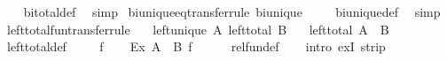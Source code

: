 \begin{isabellebody}
\ \ %
\endisadelimproof
%
\isatagproof
{}\isamarkupfalse%
\ bi{\isacharunderscore}{\kern0pt}total{\isacharunderscore}{\kern0pt}def\ \isamarkupfalse%
\ simp%
\endisatagproof
{\isafoldproof}%
%
\isadelimproof
\isanewline
%
\endisadelimproof
\isanewline
{}\isamarkupfalse%
\ bi{\isacharunderscore}{\kern0pt}unique{\isacharunderscore}{\kern0pt}eq{\isacharbrackleft}{\kern0pt}transfer{\isacharunderscore}{\kern0pt}rule{\isacharbrackright}{\kern0pt}{\isacharcolon}{\kern0pt}\ {\isachardoublequoteopen}bi{\isacharunderscore}{\kern0pt}unique\ {\isacharparenleft}{\kern0pt}{\isacharequal}{\kern0pt}{\isacharparenright}{\kern0pt}{\isachardoublequoteclose}\isanewline
%
\isadelimproof
\ \ %
\endisadelimproof
%
\isatagproof
{}\isamarkupfalse%
\ bi{\isacharunderscore}{\kern0pt}unique{\isacharunderscore}{\kern0pt}def\ \isamarkupfalse%
\ simp%
\endisatagproof
{\isafoldproof}%
%
\isadelimproof
\isanewline
%
\endisadelimproof
\isanewline
{}\isamarkupfalse%
\ left{\isacharunderscore}{\kern0pt}total{\isacharunderscore}{\kern0pt}fun{\isacharbrackleft}{\kern0pt}transfer{\isacharunderscore}{\kern0pt}rule{\isacharbrackright}{\kern0pt}{\isacharcolon}{\kern0pt}\isanewline
\ \ \ {\isachardoublequoteopen}left{\isacharunderscore}{\kern0pt}unique\ A{\isachardoublequoteclose}\ {\isachardoublequoteopen}left{\isacharunderscore}{\kern0pt}total\ B{\isachardoublequoteclose}\isanewline
\ \ \ {\isachardoublequoteopen}left{\isacharunderscore}{\kern0pt}total\ {\isacharparenleft}{\kern0pt}A\ {\isacharequal}{\kern0pt}{\isacharequal}{\kern0pt}{\isacharequal}{\kern0pt}{\isachargreater}{\kern0pt}\ B{\isacharparenright}{\kern0pt}{\isachardoublequoteclose}\isanewline
%
\isadelimproof
\ \ %
\endisadelimproof
%
\isatagproof
{}\isamarkupfalse%
\ left{\isacharunderscore}{\kern0pt}total{\isacharunderscore}{\kern0pt}def\ \isanewline
{}\isamarkupfalse%
\isanewline
\ \ \isamarkupfalse%
\ f\isanewline
\ \ \isamarkupfalse%
\ {\isachardoublequoteopen}Ex\ {\isacharparenleft}{\kern0pt}{\isacharparenleft}{\kern0pt}A\ {\isacharequal}{\kern0pt}{\isacharequal}{\kern0pt}{\isacharequal}{\kern0pt}{\isachargreater}{\kern0pt}\ B{\isacharparenright}{\kern0pt}\ f{\isacharparenright}{\kern0pt}{\isachardoublequoteclose}\isanewline
\ \ \ \ \isamarkupfalse%
\ rel{\isacharunderscore}{\kern0pt}fun{\isacharunderscore}{\kern0pt}def\isanewline
\ \ \isamarkupfalse%
\ {\isacharparenleft}{\kern0pt}intro\ exI\ strip{\isacharparenright}{\kern0pt}\isanewline

\end{isabellebody}

